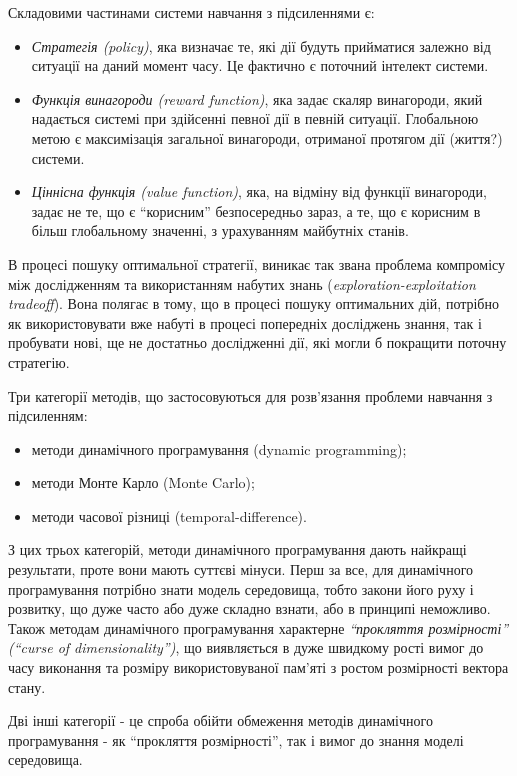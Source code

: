 Складовими частинами системи навчання з підсиленнями є:
\begin{itemize}
\item \emph{Стратегія (policy)}, яка визначає те, які дії будуть прийматися залежно від ситуації на даний момент часу. Це фактично є поточний інтелект системи.
\item \emph{Функція винагороди (reward function)}, яка задає скаляр винагороди, який надається системі при здійсенні певної дії в певній ситуації. Глобальною метою є максимізація загальної винагороди, отриманої протягом дії (життя?) системи.
\item \emph{Ціннісна функція (value function)}, яка, на відміну від функції винагороди, задає не те, що є ``корисним'' безпосередньо зараз, а те, що є корисним в більш глобальному значенні, з урахуванням майбутніх станів.
\end{itemize}

В процесі пошуку оптимальної стратегії, виникає так звана проблема компромісу між дослідженням та використанням набутих знань (\emph{exploration-exploitation tradeoff}). Вона полягає в тому, що в процесі пошуку оптимальних дій, потрібно як використовувати вже набуті в процесі попередніх досліджень знання, так і пробувати нові, ще не достатньо дослідженні дії, які могли б покращити поточну стратегію.

Три категорії методів, що застосовуються для розв'язання проблеми навчання з підсиленням:
\begin{itemize}
\item методи динамічного програмування (dynamic programming);
\item методи Монте Карло (Monte Carlo);
\item методи часової різниці (temporal-difference).
\end{itemize}

З цих трьох категорій, методи динамічного програмування дають найкращі результати, проте вони мають суттєві мінуси. Перш за все, для динамічного програмування потрібно знати модель середовища, тобто закони його руху і розвитку, що дуже часто або дуже складно взнати, або в принципі неможливо. Також методам динамічного програмування характерне \emph{``прокляття розмірності'' (``curse of dimensionality'')}, що виявляється в дуже швидкому рості вимог до часу виконання та розміру використовуваної пам'яті з ростом розмірності вектора стану.

Дві інші категорії - це спроба обійти обмеження методів динамічного
програмування - як ``прокляття розмірності'', так і вимог до знання моделі
середовища.
%

\newpage
